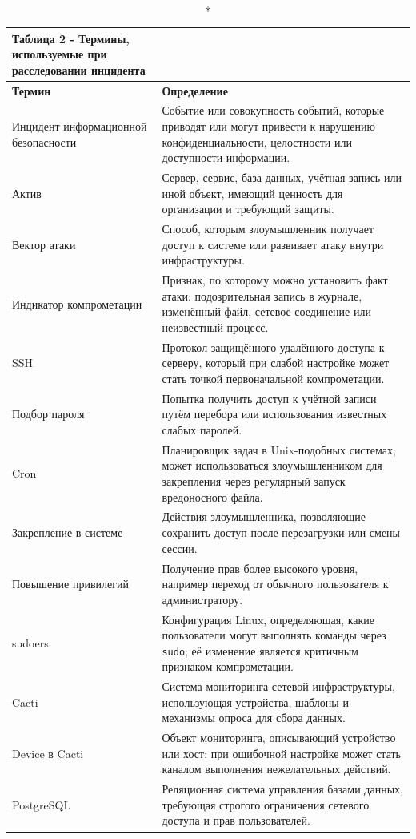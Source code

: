 \documentclass[14pt]{extarticle}
\begin{document}
\begin{longtable}{|p{4.2cm}|p{10.2cm}|}
\caption*{\hfill \textbf{Таблица 2 - Термины, используемые при расследовании инцидента}}\\
\hline
\textbf{Термин} & \textbf{Определение} \\
\hline
Инцидент информационной безопасности & Событие или совокупность событий, которые приводят или могут привести к нарушению конфиденциальности, целостности или доступности информации. \\
\hline
Актив & Сервер, сервис, база данных, учётная запись или иной объект, имеющий ценность для организации и требующий защиты. \\
\hline
Вектор атаки & Способ, которым злоумышленник получает доступ к системе или развивает атаку внутри инфраструктуры. \\
\hline
Индикатор компрометации & Признак, по которому можно установить факт атаки: подозрительная запись в журнале, изменённый файл, сетевое соединение или неизвестный процесс. \\
\hline
SSH & Протокол защищённого удалённого доступа к серверу, который при слабой настройке может стать точкой первоначальной компрометации. \\
\hline
Подбор пароля & Попытка получить доступ к учётной записи путём перебора или использования известных слабых паролей. \\
\hline
Cron & Планировщик задач в Unix-подобных системах; может использоваться злоумышленником для закрепления через регулярный запуск вредоносного файла. \\
\hline
Закрепление в системе & Действия злоумышленника, позволяющие сохранить доступ после перезагрузки или смены сессии. \\
\hline
Повышение привилегий & Получение прав более высокого уровня, например переход от обычного пользователя к администратору. \\
\hline
sudoers & Конфигурация Linux, определяющая, какие пользователи могут выполнять команды через \texttt{sudo}; её изменение является критичным признаком компрометации. \\
\hline
Cacti & Система мониторинга сетевой инфраструктуры, использующая устройства, шаблоны и механизмы опроса для сбора данных. \\
\hline
Device в Cacti & Объект мониторинга, описывающий устройство или хост; при ошибочной настройке может стать каналом выполнения нежелательных действий. \\
\hline
PostgreSQL & Реляционная система управления базами данных, требующая строгого ограничения сетевого доступа и прав пользователей. \\

\end{longtable}
\end{document}

